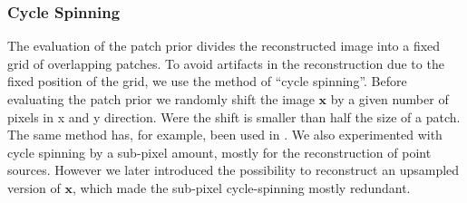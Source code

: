 \documentclass[twocolumn]{aastex631}
\DeclareMathOperator{\arcsinh}{arcsinh}
\newcommand{\todo}[1]{\textcolor{red}{TODO: #1}\PackageWarning{TODO:}{#1!}}
\begin{document}


    





    \subsubsection{Cycle Spinning}
    The evaluation of the patch prior divides the reconstructed image into a fixed grid of overlapping patches. To avoid artifacts in the reconstruction due to the fixed position of the grid, we use the method of \enquote{cycle spinning}. Before evaluating the patch prior we randomly shift the image $\mathbf{x}$ by a given number of pixels in x and y direction. Were the shift is smaller than half the size of a patch. The same method has, for example, been used in \cite{Esch2004}. We also experimented with cycle spinning by a sub-pixel amount, mostly for the reconstruction of point sources. However we later introduced the possibility to reconstruct an upsampled version of $\mathbf{x}$, which made the sub-pixel cycle-spinning mostly redundant.
    
\end{document}
